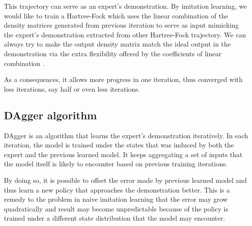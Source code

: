 \documentclass[twoside]{article}
\begin{document}
This trajectory can serve as an expert's demonstration. By imitation learning, we would like to train a Hartree-Fock 
which uses the linear combination of the density matrices generated from previous iteration to serve as input mimicking the expert's demonstration extracted from other Hartree-Fock trajectory. We can always try to make the output density matrix match the ideal output in the demonstration via the extra flexibility offered by the coefficients of linear combination .


As a consequences, it allows more progress in one iteration, thus converged with less iterations, say half or even less iterations.  







\subsection{DAgger algorithm}
DAgger is an algorithm that learns the expert's demonstration iteratively. In each iteration, the model is trained under the states that was induced by both the expert and the previous learned model. It keeps aggregating a set of inputs that the model itself is likely to encounter based on previous training iterations.  

By doing so, it is possible to offset the error made by previous learned model and thus learn a new policy that approaches the demonstration better. This is a remedy to the problem in naive imitation learning that the error may grow quadratically and result may become unpredictable because of the policy is trained under a different state distribution that the model may encounter. 
\end{document}
